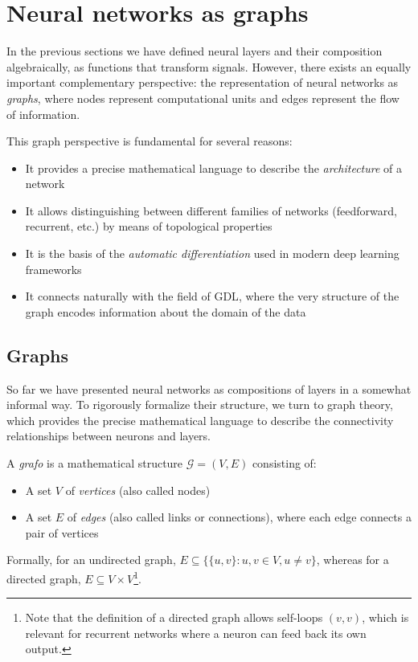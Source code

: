 \section{Neural networks as graphs}\label{sec:redes_grafos}

In the previous sections we have defined neural layers and their composition algebraically, as functions that transform signals. However, there exists an equally important complementary perspective: the representation of neural networks as \textit{graphs}, where nodes represent computational units and edges represent the flow of information.

This graph perspective is fundamental for several reasons:
\begin{itemize}
    \item It provides a precise mathematical language to describe the \textit{architecture} of a network
    \item It allows distinguishing between different families of networks (feedforward, recurrent, etc.) by means of topological properties
    \item It is the basis of the \textit{automatic differentiation} used in modern deep learning frameworks
    \item It connects naturally with the field of \gls{GDL}, where the very structure of the graph encodes information about the domain of the data
\end{itemize}

\subsection{Graphs}

So far we have presented neural networks as compositions of layers in a somewhat informal way. To rigorously formalize their structure, we turn to graph theory, which provides the precise mathematical language to describe the connectivity relationships between neurons and layers.

\begin{definition}\label{def:grafo_neuronal}
A \textit{\gls{grafo}} is a mathematical structure $\mathcal{G} = (V, E)$ consisting of:
\begin{itemize}
    \item A set $V$ of \textit{vertices} (also called nodes)
    \item A set $E$ of \textit{edges} (also called links or connections), where each edge connects a pair of vertices
\end{itemize}
Formally, for an undirected graph, $E \subseteq \{\{u, v\} : u, v \in V, u \neq v\}$, whereas for a directed graph, $E \subseteq V \times V$\footnote{Note that the definition of a directed graph allows self-loops $(v, v)$, which is relevant for recurrent networks where a neuron can feed back its own output.}.
\end{definition}

